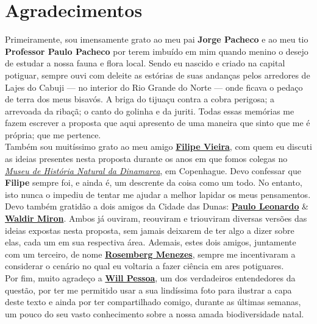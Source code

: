 \thispagestyle{plain}
\chapter*{Agradecimentos}

\hspace*{2em}Primeiramente, sou imensamente grato ao meu pai \textbf{Jorge Pacheco} e ao meu tio \textbf{Professor Paulo Pacheco} por terem imbuído em mim quando menino o desejo de estudar a nossa fauna e flora local. Sendo eu nascido e criado na capital potiguar, sempre ouvi com deleite as estórias de suas andanças pelos arredores de Lajes do Cabuji --- no interior do Rio Grande do Norte --- onde ficava o pedaço de terra dos meus bisavós. A briga do tijuaçu contra a cobra perigosa; a arrevoada da ribaçã; o canto do golinha e da juriti. Todas essas memórias me fazem escrever a proposta que aqui apresento de uma maneira que sinto que me é própria; que me pertence. \\
\hspace*{2em}Também sou muitíssimo grato ao meu amigo \textbf{\href{https://scholar.google.fr/citations?user=gvZmPNQAAAAJ&hl=fr}{Filipe Vieira}}, com quem eu discuti as ideias presentes nesta proposta durante os anos em que fomos colegas no \textit{\href{https://snm.dk/en}{Museu de História Natural da Dinamarca}}, em Copenhague. Devo confessar que \textbf{Filipe} sempre foi, e ainda é, um descrente da coisa como um todo. No entanto, isto nunca o impediu de tentar me ajudar a melhor lapidar os meus pensamentos. \\
\hspace*{2em}Devo também gratidão a dois amigos da Cidade das Dunas: \textbf{\href{https://scholar.google.com.br/citations?user=NQQBxawAAAAJ&hl=pt-BR}{Paulo Leonardo}} \& \textbf{\href{https://waldirmbf.github.io}{Waldir Miron}}. Ambos já ouviram, reouviram e triouviram diversas versões das ideias expostas nesta proposta, sem jamais deixarem de ter algo a dizer sobre elas, cada um em sua respectiva área. Ademais, estes dois amigos, juntamente com um terceiro, de nome \textbf{\href{https://scholar.google.com/citations?user=X-JyQfoAAAAJ&hl=en}{Rosemberg Menezes}}, sempre me incentivaram a considerar o cenário no qual eu voltaria a fazer ciência em ares potiguares. \\
\hspace*{2em}Por fim, muito agradeço a \textbf{\href{https://www.instagram.com/will_pessoa_bio}{Will Pessoa}}, um dos verdadeiros entendedores da questão, por ter me permitido usar a sua lindíssima foto para ilustrar a capa deste texto e ainda por ter compartilhado comigo, durante as últimas semanas, um pouco do seu vasto conhecimento sobre a nossa amada biodiversidade natal.
 
